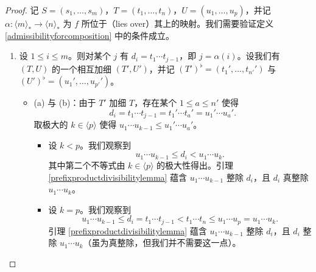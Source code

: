 \begin{proof}
    记 $S = (s_1,\dots,s_m)$，$T = (t_1,\dots,t_n)$，$U = (u_1,\dots,u_p)$，并记 $\alpha: \langle m \rangle_* \to \langle n \rangle_*$ 为 $f$ 所位于（lies over）其上的映射。我们需要验证定义 \ref{admissibilityforcomposition} 中的条件成立。
    \begin{enumerate}
        \item 设 $1 \leq i \leq m$。则对某个 $j$ 有 $d_i = t_1 \cdots t_{j-1}$，即 $j = \alpha(i)$。设我们有 $(T,U)$ 的一个相互加细 $(T', U')$，并记 $(T')^\flat = (t_1',\dots,t_{n'}')$ 与 $(U')^\flat = (u_1',\dots,u_{p'}')$。
        \begin{itemize}
            \item (a) 与 (b)：由于 $T'$ 加细 $T$，存在某个 $1 \leq a \leq n'$ 使得
            \[d_i = t_1 \cdots t_{j-1} = t_1' \cdots t_{a}' = u_1' \cdots u_a'.\]
            取极大的 $k \in \langle p \rangle$ 使得 $u_1 \cdots u_{k-1} \leq u_1' \cdots u_a'$。
            \begin{itemize}
                \item 设 $k < p$。我们观察到
                \[
                u_1 \cdots u_{k-1} \leq d_i < u_1 \cdots u_{k}.
                \]
                其中第二个不等式由 $k \in \langle p \rangle$ 的极大性得出。引理 \ref{prefixproductdivisibilitylemma} 蕴含 $u_1 \cdots u_{k-1}$ 整除 $ d_i$，且 $d_i$ 真整除 $u_1 \cdots u_{k}$。
                \item 设 $k = p$。我们观察到
                \[
                u_1 \cdots u_{k-1} \leq d_i = t_1 \cdots t_{j-1} < t_1 \cdots t_n \leq u_1 \cdots u_{p} = u_1 \cdots u_k.
                \]
                引理 \ref{prefixproductdivisibilitylemma} 蕴含 $u_1 \cdots u_{k-1}$ 整除 $ d_i$，且 $d_i$ 整除 $u_1 \cdots u_{k}$（虽为真整除，但我们并不需要这一点）。
            \end{itemize}


\end{itemize}
\end{enumerate}
\end{proof}
